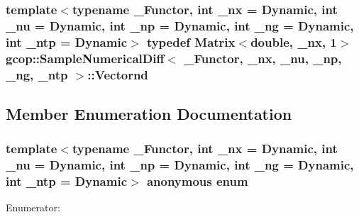 \subsubsection[{\-Vectornd}]{\setlength{\rightskip}{0pt plus 5cm}template$<$typename \-\_\-\-Functor, int \-\_\-nx = \-Dynamic, int \-\_\-nu = \-Dynamic, int \-\_\-np = \-Dynamic, int \-\_\-ng = \-Dynamic, int \-\_\-ntp = \-Dynamic$>$ typedef \-Matrix$<$double, \-\_\-nx, 1$>$ {\bf gcop\-::\-Sample\-Numerical\-Diff}$<$ \-\_\-\-Functor, \-\_\-nx, \-\_\-nu, \-\_\-np, \-\_\-ng, \-\_\-ntp $>$\-::{\bf \-Vectornd}}\label{classgcop_1_1SampleNumericalDiff_ab68f5a8eadf8116c6f5f13c35f079a02}


\subsection{\-Member \-Enumeration \-Documentation}
\subsubsection[{anonymous enum}]{\setlength{\rightskip}{0pt plus 5cm}template$<$typename \-\_\-\-Functor, int \-\_\-nx = \-Dynamic, int \-\_\-nu = \-Dynamic, int \-\_\-np = \-Dynamic, int \-\_\-ng = \-Dynamic, int \-\_\-ntp = \-Dynamic$>$ anonymous enum}\label{classgcop_1_1SampleNumericalDiff_a6d894abcf3f79ae03cf8b23a3360cd12}
\begin{Desc}
\item[\-Enumerator\-: ]\par
\begin{description}
\item[{\em 
\-Inputs\-At\-Compile\-Time\label{classgcop_1_1SampleNumericalDiff_a6d894abcf3f79ae03cf8b23a3360cd12a4fee146aacb81d10c6a660dca277626c}
}]\item[{\em 
\-Values\-At\-Compile\-Time\label{classgcop_1_1SampleNumericalDiff_a6d894abcf3f79ae03cf8b23a3360cd12a4d43f1c541424f6eb7ab388abea82e7f}
}]\end{description}
\end{Desc}



